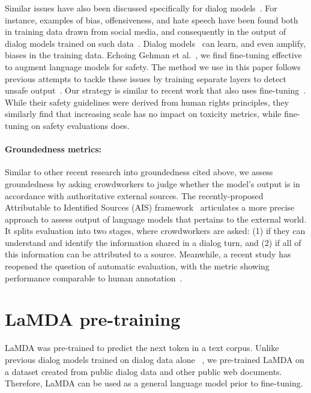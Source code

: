 \documentclass{article}
\begin{document}
Similar issues have also been discussed specifically for dialog models~\cite{dinan2021anticipating}. For instance, examples of bias, offensiveness, and hate speech have been found both in training data drawn from social media, and consequently in the output of dialog models trained on such data~\cite{henderson2018ethical}. Dialog models~\cite{dinan-etal-2020-queens} can learn, and even amplify, biases in the training data. Echoing Gehman et al.~\cite{gehman-etal-2020-realtoxicityprompts}, we find fine-tuning effective to augment language models for safety. The method we use in this paper follows previous attempts to tackle these issues by training separate layers to detect unsafe output~\cite{adiwardana2020humanlike,liu2019does,blenderbot,xu2020safetyrecipes}. Our strategy is similar to recent work that also uses fine-tuning~\cite{solaiman2021palms}. While their safety guidelines were derived from human rights principles, they similarly find that increasing scale has no impact on toxicity metrics, while fine-tuning on safety evaluations does.

\paragraph{Groundedness metrics:} Similar to other recent research into groundedness cited above, we assess groundedness by asking crowdworkers to judge whether the model’s output is in accordance with authoritative external sources. The recently-proposed Attributable to Identified Sources (AIS) framework~\cite{rashkin2021measuring} articulates a more precise approach to assess output of language models that pertains to the external world. It splits evaluation into two stages, where crowdworkers are asked: (1) if they can understand and identify the information shared in a dialog turn, and (2) if all of this information can be attributed to a source. Meanwhile, a recent study has reopened the question of automatic evaluation, with the  metric showing performance comparable to human annotation~\cite{honovich2021q2}.

\section{LaMDA pre-training}
\label{sec:pretraining}

LaMDA was pre-trained to predict the next token in a text corpus. Unlike previous dialog models trained on dialog data alone ~\cite{adiwardana2020humanlike,blenderbot}, we pre-trained LaMDA on a dataset created from public dialog data and other public web documents. Therefore, LaMDA can be used as a general language model prior to fine-tuning.
\end{document}
